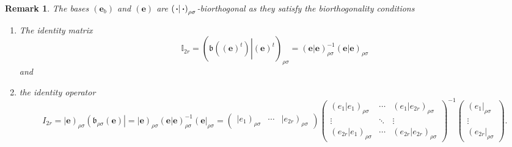 \documentclass[aps,preprint]{revtex4}
\newtheorem{remark}[theorem]{Remark}
\begin{document}
\begin{remark}
The bases $\left( \boldsymbol{e}_{b}\right) $ and $\left( \boldsymbol{e}%
\right) $ are $\left( \left. \boldsymbol{\cdot }\right\vert \boldsymbol{%
\cdot }\right) _{\rho \sigma }$-biorthogonal as they satisfy the
biorthogonality conditions

\begin{enumerate}
\item The identity matrix 
\begin{equation}
\mathbb{I}_{2r}=\left( \left. \overset{}{\mathfrak{b}\left( \left( 
\boldsymbol{e}\right) ^{t}\right) }\right\vert \left( \boldsymbol{e}\right)
^{t}\right) _{\rho \sigma }=\left( \left. \boldsymbol{e}\right\vert 
\boldsymbol{e}\right) _{\rho \sigma }^{-1}\left( \left. \boldsymbol{e}%
\right\vert \boldsymbol{e}\right) _{\rho \sigma }
\end{equation}%
and

\item the identity operator 
\begin{equation*}
I_{2r}=\left\vert \boldsymbol{e}\right) _{\rho \sigma }\left( \mathfrak{b}%
_{\rho \sigma }\left( \boldsymbol{e}\right) \right\vert =\left\vert 
\boldsymbol{e}\right) _{\rho \sigma }\left( \left. \boldsymbol{e}\right\vert 
\boldsymbol{e}\right) _{\rho \sigma }^{-1}\left( \boldsymbol{e}\right\vert
_{\rho \sigma }=\left( 
\begin{array}{ccc}
\left\vert e_{1}\right) _{\rho \sigma } & \cdots & \left\vert e_{2r}\right)
_{\rho \sigma }%
\end{array}%
\right) \left( 
\begin{array}{ccc}
\left( \left. e_{1}\right\vert e_{1}\right) _{\rho \sigma } & \cdots & 
\left( \left. e_{1}\right\vert e_{2r}\right) _{\rho \sigma } \\ 
\vdots & \ddots & \vdots \\ 
\left( \left. e_{2r}\right\vert e_{1}\right) _{\rho \sigma } & \cdots & 
\left( \left. e_{2r}\right\vert e_{2r}\right) _{\rho \sigma }%
\end{array}%
\right) ^{\boldsymbol{-}1}\left( 
\begin{array}{c}
\left( e_{1}\right\vert _{\rho \sigma } \\ 
\vdots \\ 
\left( e_{2r}\right\vert _{\rho \sigma }%
\end{array}%
\right) .
\end{equation*}
\end{enumerate}
\end{remark}
\end{document}
